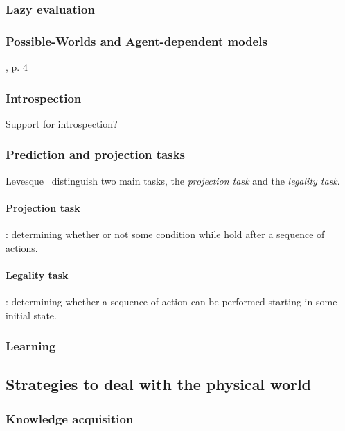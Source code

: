 \documentclass[a4paper, twocolumn]{article}
\begin{document}
\subsubsection{Lazy evaluation}
\label{sect|lazy-evaluation}

\subsubsection{Possible-Worlds and Agent-dependent models}
\label{sect|possible-worlds}

\cite{Levesque2008}, p. 4

\subsubsection{Introspection}
\label{sect|introspection}
Support for introspection?

\subsubsection{Prediction and projection tasks}
\label{sect|prediction-projection}

Levesque~\cite{Levesque2008} distinguish two main tasks, the \emph{projection task} and the \emph{legality task}.

\paragraph{Projection task}: determining whether or not some condition while hold after a sequence of actions.

\paragraph{Legality task}: determining whether a sequence of action can be performed starting in some initial state.

\subsubsection{Learning}
\label{sect|learning}


\subsection{Strategies to deal with the physical world}

\subsubsection{Knowledge acquisition}
\label{sect|knowledge-acquisition}
\end{document}
